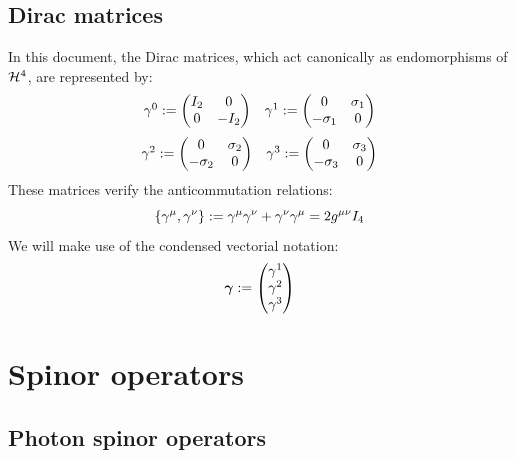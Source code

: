 \documentclass[10pt,a4paper,twoside,openany]{book}
\begin{document}
\section{Dirac matrices}
\label{Dirac matrices}

In this document, the Dirac matrices, which act canonically as endomorphisms of $\mathcal H^4$, are represented by:
$$
\begin{array}{cc}
\gamma^{0} := \begin{pmatrix} I_2 & 0 \\ 0 & -I_2 \end{pmatrix} &
\gamma^{1} := \begin{pmatrix} 0 & \sigma_{1} \\ -\sigma_{1} & 0 \end{pmatrix}
\end{array}
$$
$$
\begin{array}{cc}
\gamma^{2} := \begin{pmatrix} 0 & \sigma_{2} \\ -\sigma_{2} & 0 \end{pmatrix} &
\gamma^{3} := \begin{pmatrix} 0 & \sigma_{3} \\ -\sigma_{3} & 0 \end{pmatrix}
\end{array}
$$
These matrices verify the anticommutation relations:
\begin{equation*}
\left\{ \gamma^{\mu}, \gamma^{\nu} \right\} := \gamma^{\mu} \gamma^{\nu} + \gamma^{\nu} \gamma^{\mu} = 2 {g}^{\mu\nu} I_4
\end{equation*}
We will make use of the condensed vectorial notation:
\begin{equation*}
\boldsymbol{\gamma} := \begin{pmatrix}  \gamma^{1} \\ \gamma^{2} \\ \gamma^{3}  \end{pmatrix}
\end{equation*}

\chapter{Spinor operators}

\section{Photon spinor operators}
\label{Photon spinors}
\end{document}

